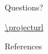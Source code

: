 \begin{frame}[standout]
\vspace{17ex}

{\Huge
Questions?%
}
\vspace{15ex}

\begin{adjustbox}{width=0.5\textwidth,center}%
\url{\projecturl}%
\end{adjustbox}

\end{frame}

\begin{frame}[allowframebreaks]{References}

  
  
\end{frame}
